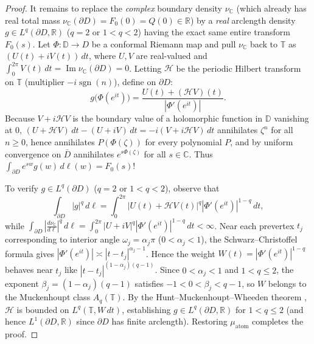 \documentclass[11pt,reqno]{amsart}
\theoremstyle{definition}
\theoremstyle{remark}
\newcommand{\C}{\mathbb{C}}
\newcommand{\R}{\mathbb{R}}
\DeclareMathOperator{\sgn}{sgn}
\begin{document}
\begin{proof}
It remains to replace the \emph{complex} boundary density $\nu_\C$ (which already has real total mass $\nu_\C(\partial D) = F_0(0) = Q(0) \in \R$) by a \emph{real} arclength density $g \in L^q(\partial D, \R)$ ($q = 2$ or $1 < q < 2$) having the exact same entire transform $F_0(s)$. Let $\Phi : \mathbb{D} \to D$ be a conformal Riemann map and pull $\nu_\C$ back to $\mathbb{T}$ as $(U(t) + i V(t))\,dt$, where $U, V$ are real-valued and $\int_0^{2\pi} V(t)\,dt = \operatorname{Im}\nu_\C(\partial D) = 0$. Letting $\mathcal{H}$ be the periodic Hilbert transform on $\mathbb{T}$ (multiplier $-i\sgn(n)$), define on $\partial D$:
\begin{equation}\label{eq:realification}
  g\bigl(\Phi(e^{it})\bigr) = \frac{U(t) + (\mathcal{H} V)(t)}{|\Phi'(e^{it})|}.
\end{equation}
Because $V + i\mathcal{H}V$ is the boundary value of a holomorphic function in $\mathbb{D}$ vanishing at $0$, $(U + \mathcal{H}V)\,dt - (U + i V)\,dt = -i(V + i\mathcal{H}V)\,dt$ annihilates $\zeta^n$ for all $n \ge 0$, hence annihilates $P(\Phi(\zeta))$ for every polynomial $P$, and by uniform convergence on $\bar D$ annihilates $e^{s\Phi(\zeta)}$ for all $s \in \C$. Thus $\int_{\partial D} e^{sw} g(w)\,d\ell(w) = F_0(s)$!

To verify $g \in L^q(\partial D)$ ($q = 2$ or $1 < q < 2$), observe that
\[
  \int_{\partial D} |g|^q\,d\ell = \int_0^{2\pi} |U(t) + \mathcal{H}V(t)|^q |\Phi'(e^{it})|^{1-q}\,dt,
\]
while $\int_{\partial D} |\frac{d\nu_\C}{d\ell}|^q\,d\ell = \int_0^{2\pi} |U + iV|^q |\Phi'(e^{it})|^{1-q}\,dt < \infty$. Near each prevertex $t_j$ corresponding to interior angle $\omega_j = \alpha_j \pi$ ($0 < \alpha_j < 1$), the Schwarz--Christoffel formula gives $|\Phi'(e^{it})| \asymp |t - t_j|^{\alpha_j - 1}$. Hence the weight $W(t) = |\Phi'(e^{it})|^{1-q}$ behaves near $t_j$ like $|t - t_j|^{(1-\alpha_j)(q-1)}$. Since $0 < \alpha_j < 1$ and $1 < q \le 2$, the exponent $\beta_j = (1-\alpha_j)(q-1)$ satisfies $-1 < 0 < \beta_j < q - 1$, so $W$ belongs to the Muckenhoupt class $A_q(\mathbb{T})$. By the Hunt--Muckenhoupt--Wheeden theorem \cite{HMW1973}, $\mathcal{H}$ is bounded on $L^q(\mathbb{T}, W\,dt)$, establishing $g \in L^q(\partial D, \R)$ for $1 < q \le 2$ (and hence $L^1(\partial D, \R)$ since $\partial D$ has finite arclength). Restoring $\mu_{\mathrm{atom}}$ completes the proof.
\end{proof}
\end{document}
